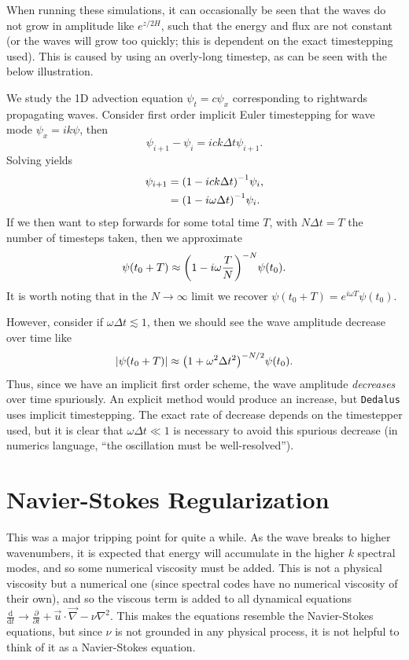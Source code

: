 \documentclass[11pt,
        usenames, %
        dvipsnames %
    ]{report}
\newcommand*{\rd}[2]{\frac{\mathrm{d}#1}{\mathrm{d}#2}}
\newcommand*{\pd}[2]{\frac{\partial#1}{\partial#2}}
\DeclarePairedDelimiter\abs{\lvert}{\rvert}
\DeclarePairedDelimiter\p{\lparen}{\rparen}
\begin{document}
When running these simulations, it can occasionally be seen that the waves do
not grow in amplitude like $e^{z/2H}$, such that the energy and flux are not
constant (or the waves will grow too quickly; this is dependent on the exact
timestepping used). This is caused by using an overly-long timestep, as can be
seen with the below illustration.

We study the 1D advection equation $\psi_t = c\psi_x$ corresponding to
rightwards propagating waves. Consider first order implicit Euler timestepping
for wave mode $\psi_x = ik\psi$, then
\begin{equation}
    \psi_{i + 1} - \psi_i = ick\Delta t\psi_{i + 1}.
\end{equation}
Solving yields
\begin{align}
    \psi_{i + 1} &= \p*{1 - ick\Delta t}^{-1}\psi_i,\nonumber\\
        &= \p*{1 - i\omega \Delta t}^{-1}\psi_i.
\end{align}
If we then want to step forwards for some total time $T$, with $N \Delta t = T$
the number of timesteps taken, then we approximate
\begin{align}
    \psi(t_0 + T) \approx \p*{1 - i\omega \frac{T}{N}}^{-N}\psi(t_0).
\end{align}
It is worth noting that in the $N \to \infty$ limit we recover $\psi(t_0 + T) =
e^{i\omega T}\psi(t_0)$.

However, consider if $\omega \Delta t \lesssim 1$, then we should see the wave
amplitude decrease over time like
\begin{equation}
    \abs*{\psi(t_0 + T)} \approx \p*{1 + \omega^2 \Delta t^2}^{-N/2}\psi(t_0).
\end{equation}
Thus, since we have an implicit first order scheme, the wave amplitude
\emph{decreases} over time spuriously. An explicit method would produce an
increase, but \lstinline{Dedalus} uses implicit timestepping. The exact rate of
decrease depends on the timestepper used, but it is clear that $\omega \Delta t
\ll 1$ is necessary to avoid this spurious decrease (in numerics language, ``the
oscillation must be well-resolved'').

\section{Navier-Stokes Regularization}

This was a major tripping point for quite a while. As the wave breaks to higher
wavenumbers, it is expected that energy will accumulate in the higher $k$
spectral modes, and so some numerical viscosity must be added. This is not a
physical viscosity but a numerical one (since spectral codes have no numerical
viscosity of their own), and so the viscous term is added to all dynamical
equations $\rd{}{t} \to \pd{}{t} + \vec{u} \cdot \vec{\nabla} - \nu \nabla^2$.
This makes the equations resemble the Navier-Stokes equations, but since $\nu$
is not grounded in any physical process, it is not helpful to think of it as a
Navier-Stokes equation.
\end{document}
